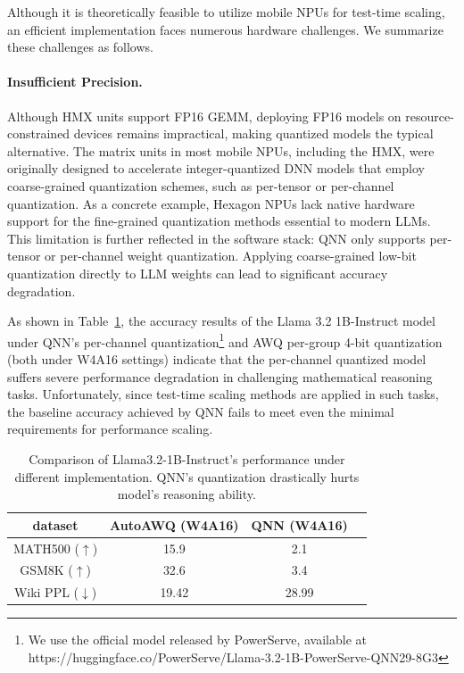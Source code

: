 Although it is theoretically feasible to utilize mobile NPUs for test-time scaling, an efficient implementation faces numerous hardware challenges. We summarize these challenges as follows.

\paragraph{Insufficient Precision.} Although HMX units support FP16 GEMM, deploying FP16 models on resource-constrained devices remains impractical, making quantized models the typical alternative. The matrix units in most mobile NPUs, including the HMX, were originally designed to accelerate integer-quantized DNN models that employ coarse-grained quantization schemes, such as per-tensor or per-channel quantization. As a concrete example, Hexagon NPUs lack native hardware support for the fine-grained quantization methods essential to modern LLMs. This limitation is further reflected in the software stack: QNN only supports per-tensor or per-channel weight quantization. Applying coarse-grained low-bit quantization directly to LLM weights can lead to significant accuracy degradation.

As shown in Table~\ref{tab:llama3.2-1b-performance-compare}, the accuracy results of the Llama 3.2 1B-Instruct model under QNN’s per-channel quantization\footnote{We use the official model released by PowerServe, available at https://huggingface.co/PowerServe/Llama-3.2-1B-PowerServe-QNN29-8G3} and AWQ per-group 4-bit quantization (both under W4A16 settings) indicate that the per-channel quantized model suffers severe performance degradation in challenging mathematical reasoning tasks. Unfortunately, since test-time scaling methods are applied in such tasks, the baseline accuracy achieved by QNN fails to meet even the minimal requirements for performance scaling.

\begin{table}[h]
    \centering
    \begin{tabular}{cccc}
        \hline
        dataset & AutoAWQ (W4A16) & QNN (W4A16) \\
        \hline
        MATH500 ($\uparrow$) & 15.9 & 2.1 \\
        GSM8K ($\uparrow$) & 32.6 & 3.4 \\
        Wiki PPL ($\downarrow$) & 19.42 & 28.99 \\
        \hline
    \end{tabular}
    \caption{Comparison of Llama3.2-1B-Instruct's performance under different implementation. QNN's quantization drastically hurts model's reasoning ability.}
    \label{tab:llama3.2-1b-performance-compare}
    \vspace{-1em}
\end{table}

